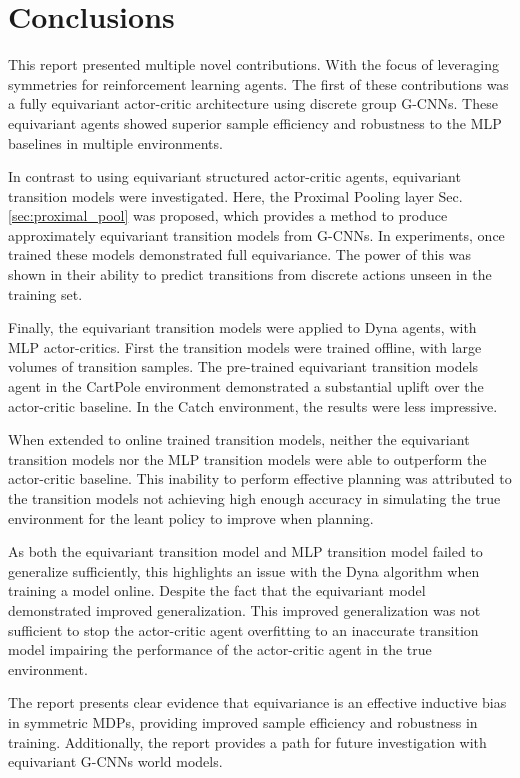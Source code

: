\chapter{Conclusions}\label{sec:conclusions}
This report presented multiple novel contributions. With the focus of leveraging symmetries for reinforcement learning agents. The first of these contributions was a fully equivariant actor-critic architecture using discrete group G-CNNs. These equivariant agents showed superior sample efficiency and robustness to the MLP baselines in multiple environments.

In contrast to using equivariant structured actor-critic agents, equivariant transition models were investigated. Here, the Proximal Pooling layer Sec.\ref{sec:proximal_pool} was proposed, which provides a method to produce approximately equivariant transition models from G-CNNs. In experiments, once trained these models demonstrated full equivariance. The power of this was shown in their ability to predict transitions from discrete actions unseen in the training set.

Finally, the equivariant transition models were applied to Dyna agents, with MLP actor-critics. First the transition models were trained offline, with large volumes of transition samples. The pre-trained equivariant transition models agent in the CartPole environment demonstrated a substantial uplift over the actor-critic baseline. In the Catch environment, the results were less impressive.

When extended to online trained transition models, neither the equivariant transition models nor the MLP transition models were able to outperform the actor-critic baseline. This inability to perform effective planning was attributed to the transition models not achieving high enough accuracy in simulating the true environment for the leant policy to improve when planning.

As both the equivariant transition model and MLP transition model failed to generalize sufficiently, this highlights an issue with the Dyna algorithm when training a model online. Despite the fact that the equivariant model demonstrated improved generalization. This improved generalization was not sufficient to stop the actor-critic agent overfitting to an inaccurate transition model impairing the performance of the actor-critic agent in the true environment.

The report presents clear evidence that equivariance is an effective inductive bias in symmetric MDPs, providing improved sample efficiency and robustness in training. Additionally, the report provides a path for future investigation with equivariant G-CNNs world models.


